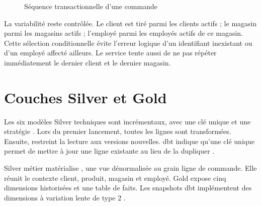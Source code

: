 \begin{figure}[htbp]
\centering
{}
\caption{Séquence transactionnelle d'une commande}
\label{fig:sequence-order}
\end{figure}

La variabilité reste contrôlée. Le client est tiré parmi les clients actifs ; le magasin parmi les magasins actifs ; l'employé parmi les employés actifs de ce magasin. Cette sélection conditionnelle évite l'erreur logique d'un identifiant inexistant ou d'un employé affecté ailleurs. Le service tente aussi de ne pas répéter immédiatement le dernier client et le dernier magasin.

\section{Couches Silver et Gold}
Les six modèles Silver techniques sont incrémentaux, avec une clé unique et une stratégie . Lors du premier lancement, toutes les lignes sont transformées. Ensuite,  restreint la lecture aux versions nouvelles. dbt indique qu'une clé unique permet de mettre à jour une ligne existante au lieu de la dupliquer \cite{dbt-incremental}.

Silver métier matérialise , une vue dénormalisée au grain ligne de commande. Elle réunit le contexte client, produit, magasin et employé. Gold expose cinq dimensions historisées et une table de faits. Les snapshots dbt implémentent des dimensions à variation lente de type 2 \cite{dbt-snapshots}.

